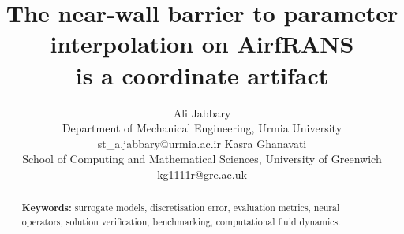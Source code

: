\documentclass{article}
\title{The near-wall barrier to parameter interpolation on AirfRANS\\ is a coordinate artifact}
\author{Ali Jabbary \\
  \addr Department of Mechanical Engineering, Urmia University \\
  \email st\_a.jabbary@urmia.ac.ir
  \AND
  Kasra Ghanavati \\
  \addr School of Computing and Mathematical Sciences, University of Greenwich \\
  \email kg1111r@gre.ac.uk}
\begin{document}
\maketitle

\begin{abstract}


\vspace{1ex}
\noindent\textbf{Keywords:} surrogate models, discretisation error, evaluation
metrics, neural operators, solution verification, benchmarking, computational
fluid dynamics.
\end{abstract}





\end{document}
